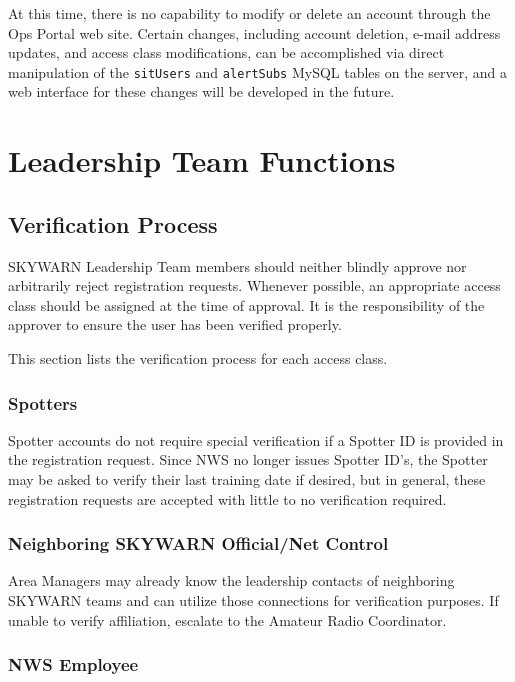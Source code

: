 \documentclass[pdflatex,letterpaper,twoside,12pt]{book}
\begin{document}
At this time, there is no capability to modify or delete an account through the Ops Portal web site.  Certain changes, including account deletion, e-mail address updates, and access class modifications, can be accomplished via direct manipulation of the \verb|sitUsers| and \verb|alertSubs| MySQL tables on the server, and a web interface for these changes will be developed in the future.


\section{Leadership Team Functions}\label{sit-leadership-functions}

\subsection{Verification Process}

SKYWARN Leadership Team members should neither blindly approve nor arbitrarily reject registration requests.  Whenever possible, an appropriate access class should be assigned at the time of approval.  It is the responsibility of the approver to ensure the user has been verified properly.

This section lists the verification process for each access class.

\subsubsection{Spotters}

Spotter accounts do not require special verification if a Spotter ID is provided in the registration request.  Since NWS no longer issues Spotter ID's, the Spotter may be asked to verify their last training date if desired, but in general, these registration requests are accepted with little to no verification required.

\subsubsection{Neighboring SKYWARN Official/Net Control}

Area Managers may already know the leadership contacts of neighboring SKYWARN teams and can utilize those connections for verification purposes.  If unable to verify affiliation, escalate to the Amateur Radio Coordinator.

\subsubsection{NWS Employee}
\end{document}

